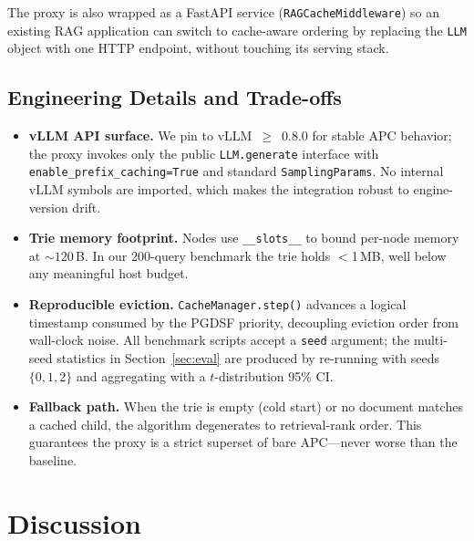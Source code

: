 \documentclass{article}
\begin{document}
The proxy is also wrapped as a FastAPI service (\texttt{RAGCacheMiddleware}) so an existing RAG application can switch to cache-aware ordering by replacing the \texttt{LLM} object with one HTTP endpoint, without touching its serving stack.

\subsection{Engineering Details and Trade-offs}

\begin{itemize}
\item \textbf{vLLM API surface.} We pin to vLLM~$\geq$~0.8.0 for stable APC behavior; the proxy invokes only the public \texttt{LLM.generate} interface with \texttt{enable\_prefix\_caching=True} and standard \texttt{SamplingParams}. No internal vLLM symbols are imported, which makes the integration robust to engine-version drift.
\item \textbf{Trie memory footprint.} Nodes use \texttt{\_\_slots\_\_} to bound per-node memory at ${\sim}120$\,B. In our 200-query benchmark the trie holds $<$1\,MB, well below any meaningful host budget.
\item \textbf{Reproducible eviction.} \texttt{CacheManager.step()} advances a logical timestamp consumed by the PGDSF priority, decoupling eviction order from wall-clock noise. All benchmark scripts accept a \texttt{seed} argument; the multi-seed statistics in Section~\ref{sec:eval} are produced by re-running with seeds $\{0,1,2\}$ and aggregating with a $t$-distribution 95\% CI.
\item \textbf{Fallback path.} When the trie is empty (cold start) or no document matches a cached child, the algorithm degenerates to retrieval-rank order. This guarantees the proxy is a strict superset of bare APC---never worse than the baseline.
\end{itemize}

\section{Discussion}
\label{sec:discussion}
\end{document}

